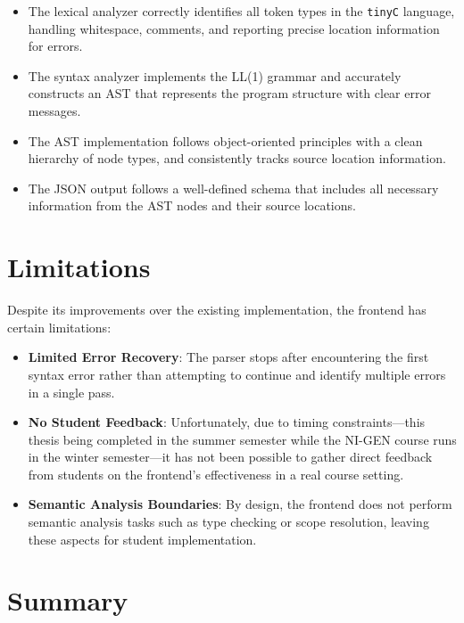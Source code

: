 \begin{itemize}
    \item The lexical analyzer correctly identifies all token types in the \texttt{tinyC} language, handling whitespace, comments, and reporting precise location information for errors.
    
    \item The syntax analyzer implements the LL(1) grammar and accurately constructs an AST that represents the program structure with clear error messages.
    
    \item The AST implementation follows object-oriented principles with a clean hierarchy of node types, and consistently tracks source location information.
    
    \item The JSON output follows a well-defined schema that includes all necessary information from the AST nodes and their source locations.
\end{itemize}

\section{Limitations}

Despite its improvements over the existing implementation, the frontend has certain limitations:

\begin{itemize}
    \item \textbf{Limited Error Recovery}: The parser stops after encountering the first syntax error rather than attempting to continue and identify multiple errors in a single pass.
    
    \item \textbf{No Student Feedback}: Unfortunately, due to timing constraints—this thesis being completed in the summer semester while the NI-GEN course runs in the winter semester—it has not been possible to gather direct feedback from students on the frontend's effectiveness in a real course setting.
    
    \item \textbf{Semantic Analysis Boundaries}: By design, the frontend does not perform semantic analysis tasks such as type checking or scope resolution, leaving these aspects for student implementation.
\end{itemize}


\section{Summary}

